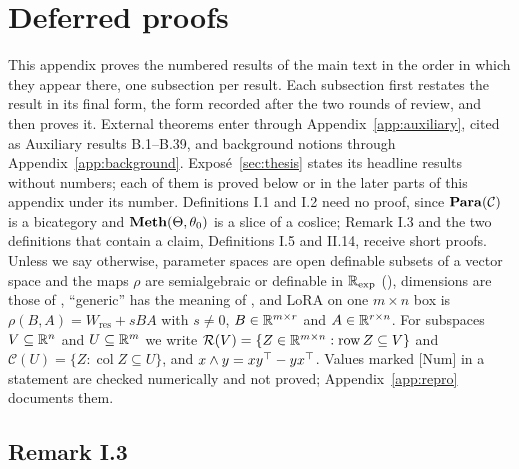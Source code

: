 \section{Deferred proofs}\label{app:proofs}

This appendix proves the numbered results of the main text in the order in which they appear there, one subsection per
result. Each subsection first restates the result in its final form, the form recorded after the two rounds of review,
and then proves it. External theorems enter through Appendix~\ref{app:auxiliary}, cited as Auxiliary results B.1--B.39,
and background notions through Appendix~\ref{app:background}. Exposé~\ref{sec:thesis} states its headline results
without numbers; each of them is proved below or in the later parts of this appendix under its number. Definitions I.1
and I.2 need no proof, since $\mathbf{Para}(\mathcal C)$ is a bicategory \citep{fong2017backprop,cruttwell2021categorical} and
$\mathbf{Meth}(\Theta,\theta_0)$ is a slice of a coslice; Remark I.3 and the two definitions that contain a claim, Definitions
I.5 and II.14, receive short proofs. Unless we say otherwise, parameter spaces are open definable subsets of a vector
space and the maps $\rho$ are semialgebraic or definable in $\mathbb{R}_{\exp}$ (), dimensions are those of
, ``generic'' has the meaning of , and LoRA on one $m\times n$ box is
$\rho(B,A)=W_{\mathrm{res}}+sBA$ with $s\ne0$, $B\in\mathbb{R}^{m\times r}$ and $A\in\mathbb{R}^{r\times n}$. For subspaces
$V\subseteq\mathbb{R}^n$ and $U\subseteq\mathbb{R}^m$ we write $\mathcal R(V)=\{Z\in\mathbb{R}^{m\times n}:\operatorname{row}Z\subseteq V\}$ and
$\mathcal C(U)=\{Z:\operatorname{col}Z\subseteq U\}$, and $x\wedge y=xy^{\top}-yx^{\top}$. Values marked [Num] in a statement are
checked numerically and not proved; Appendix~\ref{app:repro} documents them.

\subsection{Remark I.3}\label{proof:I.3}

